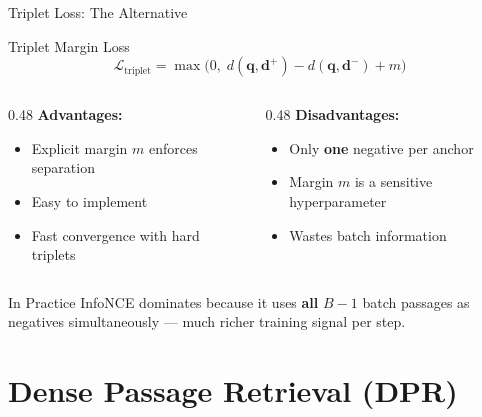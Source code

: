 \documentclass[aspectratio=169]{beamer}
\newif\ifanimated
\newcommand{\cpause}{\ifanimated\pause\fi}
\newcommand{\vq}{\mathbf{q}}
\newcommand{\vd}{\mathbf{d}}
\begin{document}
\begin{frame}{Triplet Loss: The Alternative}
\begin{block}{Triplet Margin Loss}
$$\mathcal{L}_{\text{triplet}} = \max\!\bigl(0,\; d(\vq, \vd^+) - d(\vq, \vd^-) + m\bigr)$$
\end{block}

\vspace{0.5em}

\begin{columns}
\begin{column}{0.48\textwidth}
\textbf{\textcolor{green}{\checkmark} Advantages:}
\begin{itemize}
    \item Explicit margin $m$ enforces separation
    \item Easy to implement
    \item Fast convergence with hard triplets
\end{itemize}
\end{column}
\begin{column}{0.48\textwidth}
\textbf{\textcolor{red}{} Disadvantages:}
\begin{itemize}
    \item Only \textbf{one} negative per anchor
    \item Margin $m$ is a sensitive hyperparameter
    \item Wastes batch information
\end{itemize}
\end{column}
\end{columns}

\cpause
\vspace{1em}

\begin{exampleblock}{In Practice}
InfoNCE dominates because it uses \textbf{all} $B-1$ batch passages as negatives simultaneously --- much richer training signal per step.
\end{exampleblock}
\end{frame}

\section{Dense Passage Retrieval (DPR)}

\begin{frame}[plain]
\sectionpage
\end{frame}
\end{document}
